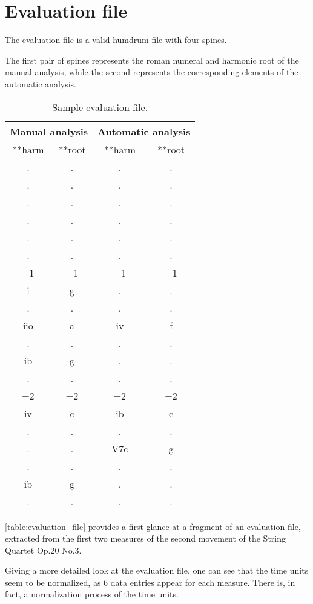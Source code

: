 \section{Evaluation file}
	The evaluation file is a valid humdrum file with four spines.

	The first pair of spines represents the roman numeral and harmonic root of the manual analysis, while the second represents the corresponding elements of the automatic analysis.

	\begin{table}[tbp]
	\centering
	\begin{tabular}{|cc|cc|}
	\hline
	\multicolumn{2}{|c|}{Manual analysis} & \multicolumn{2}{c|}{Automatic analysis} \\ \hline
	**harm & **root & **harm & **root \\
	. & . & . & . \\
	. & . & . & . \\
	. & . & . & . \\
	. & . & . & . \\
	. & . & . & . \\
	. & . & . & . \\
	=1 & =1 & =1 & =1 \\
	i & g & . & . \\
	. & . & . & . \\
	iio & a & iv & f \\
	. & . & . & . \\
	ib & g & . & . \\
	. & . & . & . \\
	=2 & =2 & =2 & =2 \\
	iv & c & ib & c \\
	. & . & . & . \\
	. & . & V7c & g \\
	. & . & . & . \\
	ib & g & . & . \\
	. & . & . & . \\ \hline
	\end{tabular}
	\caption{Sample evaluation file.}
	\label{table:evaluation_file}
	\end{table}

	\autoref{table:evaluation_file} provides a first glance at a fragment of an evaluation file, extracted from the first two measures of the second movement of the String Quartet Op.20 No.3.

	Giving a more detailed look at the evaluation file, one can see that the time units seem to be normalized, as 6 data entries appear for each measure. There is, in fact, a normalization process of the time units.

